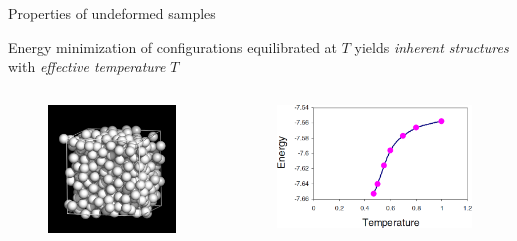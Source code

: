 \documentclass[compress]{beamer}
\begin{document}
	\begin{frame}{Properties of undeformed samples}

		\begin{block}{}

			Energy minimization of configurations equilibrated at $T$ yields \emph{inherent structures} with \emph{effective temperature} $T$

			\begin{columns}[T]
				
				\begin{column}{0.3\textwidth}
					\centering{}
					\vspace{0.5cm}
					\begin{figure}
						\includegraphics[width=0.9\columnwidth]{Graphics/Quench/quench-5}
					\end{figure}
				\end{column}


				\begin{column}{0.7\textwidth}
					\begin{figure}
						\includegraphics[width=0.8\columnwidth]{Graphics/Literature/EnergyvsT}
					\end{figure}
				\end{column}
			

\end{columns}
\end{block}
\end{frame}
\end{document}
